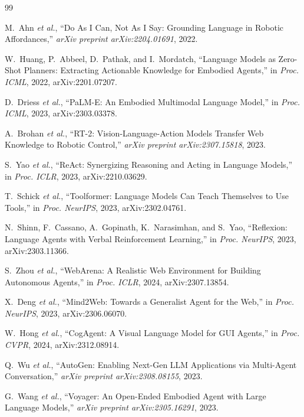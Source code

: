 \documentclass{article}
\begin{document}

\begin{thebibliography}{99}

M.~Ahn \textit{et al.}, ``Do As I Can, Not As I Say: Grounding Language in
Robotic Affordances,'' \textit{arXiv preprint arXiv:2204.01691}, 2022.

W.~Huang, P.~Abbeel, D.~Pathak, and I.~Mordatch, ``Language Models as
Zero-Shot Planners: Extracting Actionable Knowledge for Embodied Agents,''
in \textit{Proc. ICML}, 2022, arXiv:2201.07207.

D.~Driess \textit{et al.}, ``PaLM-E: An Embodied Multimodal Language
Model,'' in \textit{Proc. ICML}, 2023, arXiv:2303.03378.

A.~Brohan \textit{et al.}, ``RT-2: Vision-Language-Action Models Transfer
Web Knowledge to Robotic Control,'' \textit{arXiv preprint
arXiv:2307.15818}, 2023.

S.~Yao \textit{et al.}, ``ReAct: Synergizing Reasoning and Acting in
Language Models,'' in \textit{Proc. ICLR}, 2023, arXiv:2210.03629.

T.~Schick \textit{et al.}, ``Toolformer: Language Models Can Teach
Themselves to Use Tools,'' in \textit{Proc. NeurIPS}, 2023,
arXiv:2302.04761.

N.~Shinn, F.~Cassano, A.~Gopinath, K.~Narasimhan, and S.~Yao, ``Reflexion:
Language Agents with Verbal Reinforcement Learning,'' in \textit{Proc.
NeurIPS}, 2023, arXiv:2303.11366.

S.~Zhou \textit{et al.}, ``WebArena: A Realistic Web Environment for
Building Autonomous Agents,'' in \textit{Proc. ICLR}, 2024,
arXiv:2307.13854.

X.~Deng \textit{et al.}, ``Mind2Web: Towards a Generalist Agent for the
Web,'' in \textit{Proc. NeurIPS}, 2023, arXiv:2306.06070.

W.~Hong \textit{et al.}, ``CogAgent: A Visual Language Model for GUI
Agents,'' in \textit{Proc. CVPR}, 2024, arXiv:2312.08914.

Q.~Wu \textit{et al.}, ``AutoGen: Enabling Next-Gen LLM Applications via
Multi-Agent Conversation,'' \textit{arXiv preprint arXiv:2308.08155}, 2023.

G.~Wang \textit{et al.}, ``Voyager: An Open-Ended Embodied Agent with
Large Language Models,'' \textit{arXiv preprint arXiv:2305.16291}, 2023.


\end{thebibliography}
\end{document}
